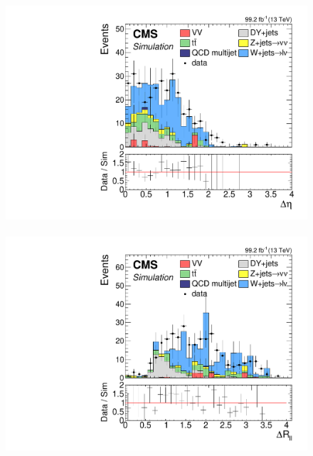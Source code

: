\begin{figure}[!htb]
\includegraphics[width=0.48\linewidth]{plots/dilepton_muons_data_control_region_phase1/none_deltaEtaCorrJetNoMultIso10Dr0.6.pdf} \,
\includegraphics[width=0.48\linewidth]{plots/dilepton_muons_data_control_region_phase1/none_deltaRCorrJetNoMultIso10Dr0.6.pdf} \\

\end{figure} 